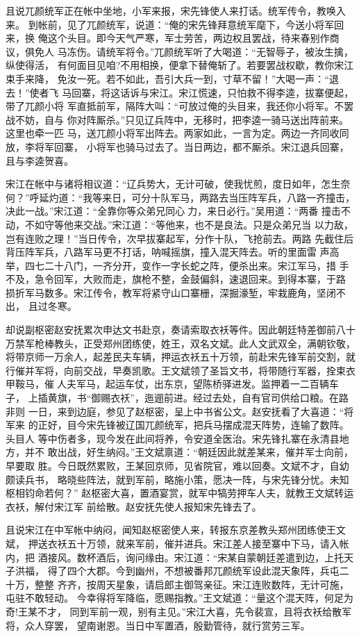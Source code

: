 且说兀颜统军正在帐中坐地，小军来报，宋先锋使人来打话。统军传令，教唤入来。
到帐前，见了兀颜统军，说道：“俺的宋先锋拜意统军麾下，今送小将军回来，换
俺这个头目。即今天气严寒，军士劳苦，两边权且罢战，待来春别作商议，俱免人
马冻伤。请统军将令。”兀颜统军听了大喝道：“无智辱子，被汝生擒，纵使得活，
有何面目见咱?不用相换，便拿下替俺斩了。若要罢战权歇，教你宋江束手来降，
免汝一死。若不如此，吾引大兵一到，寸草不留！”大喝一声：“退去！”使者飞
马回寨，将这话诉与宋江。宋江慌速，只怕救不得李逵，拔寨便起，带了兀颜小将
军直抵前军，隔阵大叫：“可放过俺的头目来，我还你小将军。不罢战不妨，自与
你对阵厮杀。”只见辽兵阵中，无移时，把李逵一骑马送出阵前来。这里也牵一匹
马，送兀颜小将军出阵去。两家如此，一言为定。两边一齐同收同放，李将军回寨，
小将军也骑马过去了。当日两边，都不厮杀。宋江退兵回寨，且与李逵贺喜。

宋江在帐中与诸将相议道：“辽兵势大，无计可破，使我忧煎，度日如年，怎生奈
何？”呼延灼道：“我等来日，可分十队军马，两路去当压阵军兵，八路一齐撞击，
决此一战。”宋江道：“全靠你等众弟兄同心力，来日必行。”吴用道：“两番
撞击不动，不如守等他来交战。”宋江道：“等他来，也不是良法。只是众弟兄当
以力敌，岂有连败之理！”当日传令，次早拔寨起军，分作十队，飞抢前去。两路
先截住后背压阵军兵，八路军马更不打话，呐喊摇旗，撞入混天阵去。听的里面雷
声高举，四七二十八门，一齐分开，变作一字长蛇之阵，便杀出来。宋江军马，措
手不及，急令回军，大败而走，旗枪不整，金鼓偏斜，速退回来。到得本寨，于路
损折军马数多。宋江传令，教军将紧守山口寨栅，深掘濠堑，牢栽鹿角，坚闭不出，
且过冬寒。

却说副枢密赵安抚累次申达文书赴京，奏请索取衣袄等件。因此朝廷特差御前八十
万禁军枪棒教头，正受郑州团练使，姓王，双名文斌。此人文武双全，满朝钦敬，
将带京师一万余人，起差民夫车辆，押运衣袄五十万领，前赴宋先锋军前交割，就
行催并军将，向前交战，早奏凯歌。王文斌领了圣旨文书，将带随行军器，拴束衣
甲鞍马，催人夫军马，起运车仗，出东京，望陈桥驿进发。监押着一二百辆车子，
上插黄旗，书“御赐衣袄”，迤逦前进。经过去处，自有官司供给口粮。在路非则
一日，来到边庭，参见了赵枢密，呈上中书省公文。赵安抚看了大喜道：“将军来
的正好，目今宋先锋被辽国兀颜统军，把兵马摆成混天阵势，连输了数阵。头目人
等中伤者多，现今发在此间将养，令安道全医治。宋先锋扎寨在永清县地方，并不
敢出战，好生纳闷。”王文斌禀道：“朝廷因此就差某来，催并军士向前，早要取
胜。今日既然累败，王某回京师，见省院官，难以回奏。文斌不才，自幼颇读兵书，
略晓些阵法，就到军前，略施小策，愿决一阵，与宋先锋分忧。未知枢相钧命若何？”
赵枢密大喜，置酒宴赏，就军中犒劳押车人夫，就教王文斌转运衣袄，解付宋江军
前给散。赵安抚先使人报知宋先锋去了。

且说宋江在中军帐中纳闷，闻知赵枢密使人来，转报东京差教头郑州团练使王文斌，
押送衣袄五十万领，就来军前，催并进兵。宋江差人接至寨中下马，请入帐内，把
酒接风。数杯酒后，询问缘由。宋江道：“宋某自蒙朝廷差遣到边，上托天子洪福，
得了四个大郡。今到幽州，不想被番邦兀颜统军设此混天象阵，兵屯二十万，整整
齐齐，按周天星象，请启郎主御驾亲征。宋江连败数阵，无计可施，屯驻不敢轻动。
今幸得将军降临，愿赐指教。”王文斌道：“量这个混天阵，何足为奇!王某不才，
同到军前一观，别有主见。”宋江大喜，先令裴宣，且将衣袄给散军将，众人穿罢，
望南谢恩。当日中军置酒，殷勤管待，就行赏劳三军。

